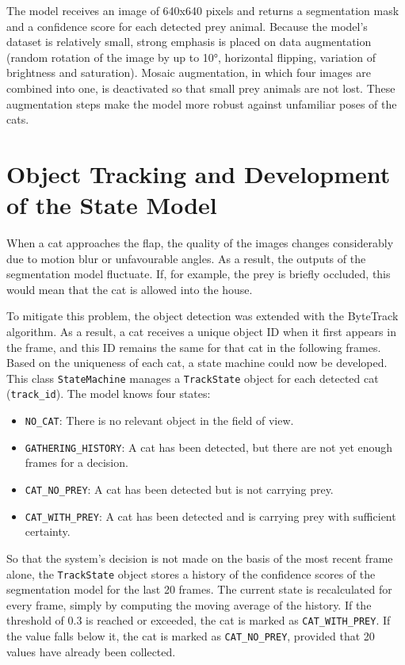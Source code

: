 The model receives an image of 640x640 pixels and returns a segmentation mask and a confidence score for each detected prey animal. Because the model's dataset is relatively small, strong emphasis is placed on data augmentation (random rotation of the image by up to 10°, horizontal flipping, variation of brightness and saturation). Mosaic augmentation, in which four images are combined into one, is deactivated so that small prey animals are not lost. These augmentation steps make the model more robust against unfamiliar poses of the cats.

\section{Object Tracking and Development of the State Model}
When a cat approaches the flap, the quality of the images changes considerably due to motion blur or unfavourable angles. As a result, the outputs of the segmentation model fluctuate. If, for example, the prey is briefly occluded, this would mean that the cat is allowed into the house.

To mitigate this problem, the object detection was extended with the ByteTrack algorithm. As a result, a cat receives a unique object ID when it first appears in the frame, and this ID remains the same for that cat in the following frames. Based on the uniqueness of each cat, a state machine could now be developed. This class \texttt{StateMachine} manages a \texttt{TrackState} object for each detected cat (\texttt{track\_id}). The model knows four states:

\begin{itemize}
    \item \texttt{NO\_CAT}: There is no relevant object in the field of view.
    \item \texttt{GATHERING\_HISTORY}: A cat has been detected, but there are not yet enough frames for a decision.
    \item \texttt{CAT\_NO\_PREY}: A cat has been detected but is not carrying prey.
    \item \texttt{CAT\_WITH\_PREY}: A cat has been detected and is carrying prey with sufficient certainty.
\end{itemize}

So that the system's decision is not made on the basis of the most recent frame alone, the \texttt{TrackState} object stores a history of the confidence scores of the segmentation model for the last 20 frames. The current state is recalculated for every frame, simply by computing the moving average of the history. If the threshold of 0.3 is reached or exceeded, the cat is marked as \texttt{CAT\_WITH\_PREY}. If the value falls below it, the cat is marked as \texttt{CAT\_NO\_PREY}, provided that 20 values have already been collected.


